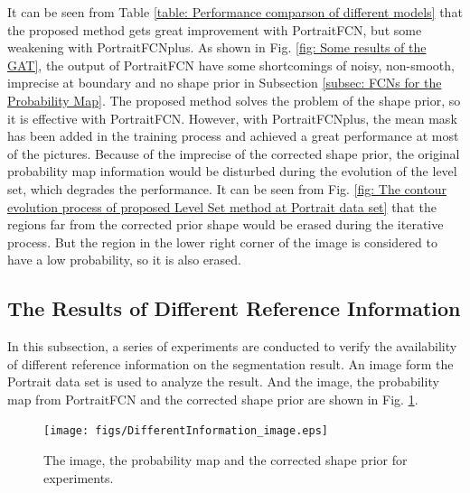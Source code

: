 It can be seen from Table \ref{table: Performance comparson of different models} that the proposed method gets great improvement with PortraitFCN, but some weakening with PortraitFCNplus. As shown in Fig. \ref{fig: Some results of the GAT}, the output of PortraitFCN have some shortcomings of noisy, non-smooth, imprecise at boundary and no shape prior in Subsection \ref{subsec: FCNs for the Probability Map}. The proposed method solves the problem of the shape prior, so it is effective with PortraitFCN. However, with PortraitFCNplus, the mean mask has been added in the training process and achieved a great performance at most of the pictures. Because of the imprecise of the corrected shape prior, the original probability map information would be disturbed during the evolution of the level set, which degrades the performance. It can be seen from Fig. \ref{fig: The contour evolution process of proposed Level Set method at Portrait data set} that the regions far from the corrected prior shape would be erased during the iterative process. But the region in the lower right corner of the image is considered to have a low probability, so it is also erased.

\subsection{The Results of Different Reference Information}
In this subsection, a series of experiments are conducted to verify the availability of different reference information on the segmentation result. An image form the Portrait data set is used to analyze the result. And the image, the probability map from PortraitFCN and the corrected shape prior are shown in Fig. \ref{fig: The image, the probability map and the corrected shape prior for experiments}.
\begin{figure}[h]
    \centering
    \texttt{[image: figs/DifferentInformation\_image.eps]}
    \caption{The image, the probability map and the corrected shape prior for experiments.}
    \label{fig: The image, the probability map and the corrected shape prior for experiments}
\end{figure}

